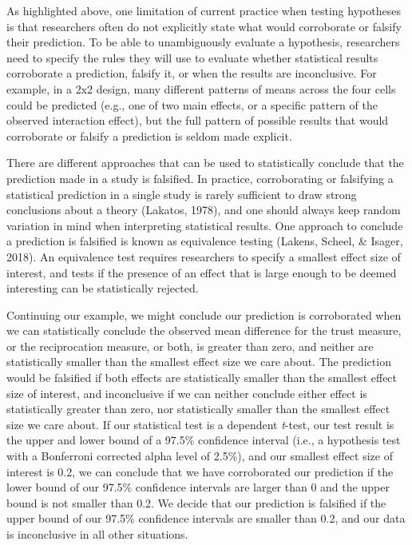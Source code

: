 \documentclass[
  english,
  doc,floatsintext]{apa6}
\begin{document}
As highlighted above, one limitation of current practice when testing hypotheses is that researchers often do not explicitly state what would corroborate or falsify their prediction. To be able to unambiguously evaluate a hypothesis, researchers need to specify the rules they will use to evaluate whether statistical results corroborate a prediction, falsify it, or when the results are inconclusive. For example, in a 2x2 design, many different patterns of means across the four cells could be predicted (e.g., one of two main effects, or a specific pattern of the observed interaction effect), but the full pattern of possible results that would corroborate or falsify a prediction is seldom made explicit.

There are different approaches that can be used to statistically conclude that the prediction made in a study is falsified. In practice, corroborating or falsifying a statistical prediction in a single study is rarely sufficient to draw strong conclusions about a theory (Lakatos, 1978), and one should always keep random variation in mind when interpreting statistical results. One approach to conclude a prediction is falsified is known as equivalence testing (Lakens, Scheel, \& Isager, 2018). An equivalence test requires researchers to specify a smallest effect size of interest, and tests if the presence of an effect that is large enough to be deemed interesting can be statistically rejected.

Continuing our example, we might conclude our prediction is corroborated when we can statistically conclude the observed mean difference for the trust measure, or the reciprocation measure, or both, is greater than zero, and neither are statistically smaller than the smallest effect size we care about. The prediction would be falsified if both effects are statistically smaller than the smallest effect size of interest, and inconclusive if we can neither conclude either effect is statistically greater than zero, nor statistically smaller than the smallest effect size we care about. If our statistical test is a dependent \emph{t}-test, our test result is the upper and lower bound of a 97.5\% confidence interval (i.e., a hypothesis test with a Bonferroni corrected alpha level of 2.5\%), and our smallest effect size of interest is 0.2, we can conclude that we have corroborated our prediction if the lower bound of our 97.5\% confidence intervals are larger than 0 and the upper bound is not smaller than 0.2. We decide that our prediction is falsified if the upper bound of our 97.5\% confidence intervals are smaller than 0.2, and our data is inconclusive in all other situations.
\end{document}
